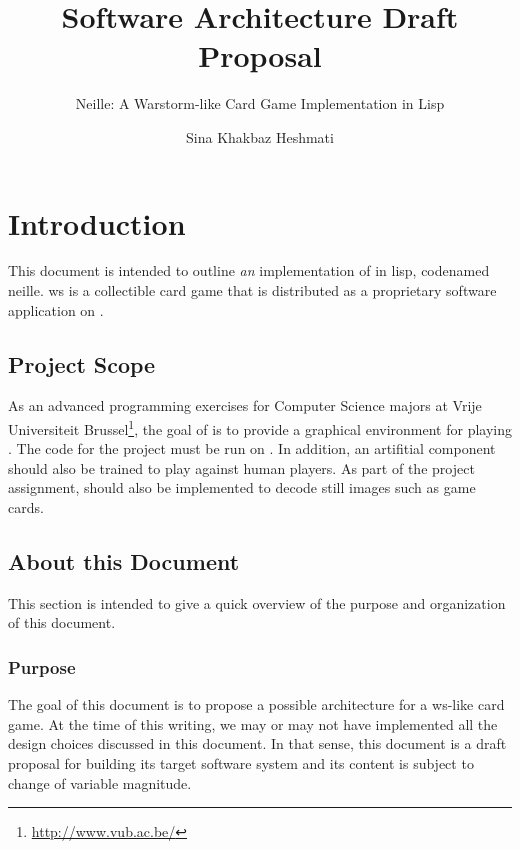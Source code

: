 \documentclass[10pt,oneside,a4paper]{skh-scrreprt}
\title{Software Architecture Draft Proposal}
\subtitle{Neille: A Warstorm-like Card Game Implementation in Lisp}
\author{Sina Khakbaz Heshmati}
\begin{document}
\maketitle
\tableofcontents
\listoffigures

\chapter{Introduction}\label{chap:intro}

This document is intended 
to outline \emph{an} implementation of
 in \gls{lisp}, 
codenamed \gls{neille}. 
\gls{ws} is a collectible card 
game that is distributed as 
a proprietary software application 
on .

\section{Project Scope}\label{sec:scope}


As an advanced programming exercises for 
Computer Science majors at
Vrije Universiteit 
Brussel\footnote{\url{http://www.vub.ac.be/}}, 
the goal of  is to 
provide a graphical environment for
playing . The code for 
the project must be run on 
. 
In addition, 
an artifitial component should also 
be trained to play against human players. 
As part of the project assignment, 
 should also be 
implemented to decode still images 
such as game cards.

\section{About this Document}\label{meta}

This section is intended to give a quick 
overview of the purpose and organization
of this document.

\subsection{Purpose}

The goal of this document 
is to propose a possible 
architecture for a
\gls{ws}-like card game.
At the time of this writing, we may or 
may not have implemented all
the design choices discussed in this document. 
In that sense, this document is a draft proposal 
for building its target software system
and its content is subject to change of 
variable magnitude.
\end{document}

